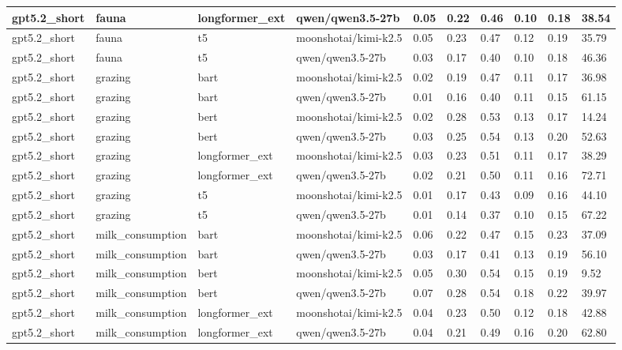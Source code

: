 \begin{tabular}{|l|l|l|l|l|l|l|l|l|l|}
 \hline
 gpt5.2\_short & fauna & longformer\_ext & qwen/qwen3.5-27b & 0.05 & 0.22 & 0.46 & 0.10 & 0.18 & 38.54 \\
 \hline
 gpt5.2\_short & fauna & t5 & moonshotai/kimi-k2.5 & 0.05 & 0.23 & 0.47 & 0.12 & 0.19 & 35.79 \\
 \hline
 gpt5.2\_short & fauna & t5 & qwen/qwen3.5-27b & 0.03 & 0.17 & 0.40 & 0.10 & 0.18 & 46.36 \\
 \hline
 gpt5.2\_short & grazing & bart & moonshotai/kimi-k2.5 & 0.02 & 0.19 & 0.47 & 0.11 & 0.17 & 36.98 \\
 \hline
 gpt5.2\_short & grazing & bart & qwen/qwen3.5-27b & 0.01 & 0.16 & 0.40 & 0.11 & 0.15 & 61.15 \\
 \hline
 gpt5.2\_short & grazing & bert & moonshotai/kimi-k2.5 & 0.02 & 0.28 & 0.53 & 0.13 & 0.17 & 14.24 \\
 \hline
 gpt5.2\_short & grazing & bert & qwen/qwen3.5-27b & 0.03 & 0.25 & 0.54 & 0.13 & 0.20 & 52.63 \\
 \hline
 gpt5.2\_short & grazing & longformer\_ext & moonshotai/kimi-k2.5 & 0.03 & 0.23 & 0.51 & 0.11 & 0.17 & 38.29 \\
 \hline
 gpt5.2\_short & grazing & longformer\_ext & qwen/qwen3.5-27b & 0.02 & 0.21 & 0.50 & 0.11 & 0.16 & 72.71 \\
 \hline
 gpt5.2\_short & grazing & t5 & moonshotai/kimi-k2.5 & 0.01 & 0.17 & 0.43 & 0.09 & 0.16 & 44.10 \\
 \hline
 gpt5.2\_short & grazing & t5 & qwen/qwen3.5-27b & 0.01 & 0.14 & 0.37 & 0.10 & 0.15 & 67.22 \\
 \hline
 gpt5.2\_short & milk\_consumption & bart & moonshotai/kimi-k2.5 & 0.06 & 0.22 & 0.47 & 0.15 & 0.23 & 37.09 \\
 \hline
 gpt5.2\_short & milk\_consumption & bart & qwen/qwen3.5-27b & 0.03 & 0.17 & 0.41 & 0.13 & 0.19 & 56.10 \\
 \hline
 gpt5.2\_short & milk\_consumption & bert & moonshotai/kimi-k2.5 & 0.05 & 0.30 & 0.54 & 0.15 & 0.19 & 9.52 \\
 \hline
 gpt5.2\_short & milk\_consumption & bert & qwen/qwen3.5-27b & 0.07 & 0.28 & 0.54 & 0.18 & 0.22 & 39.97 \\
 \hline
 gpt5.2\_short & milk\_consumption & longformer\_ext & moonshotai/kimi-k2.5 & 0.04 & 0.23 & 0.50 & 0.12 & 0.18 & 42.88 \\
 \hline
 gpt5.2\_short & milk\_consumption & longformer\_ext & qwen/qwen3.5-27b & 0.04 & 0.21 & 0.49 & 0.16 & 0.20 & 62.80 \\
 \hline

\end{tabular}
